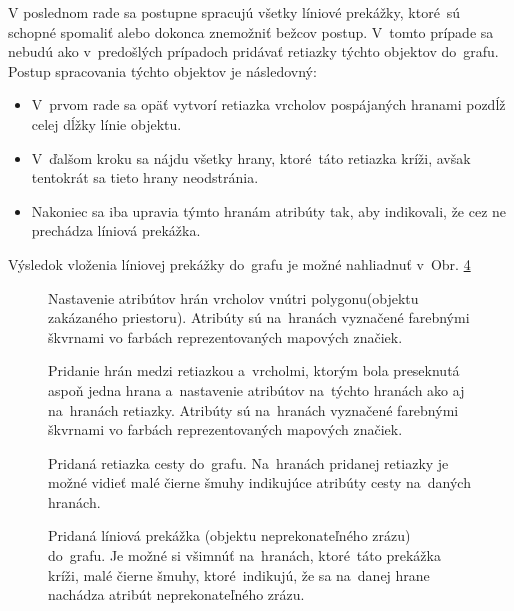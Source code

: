 V poslednom rade sa postupne spracujú všetky líniové prekážky, ktoré~sú schopné spomaliť alebo dokonca znemožniť bežcov postup. V~tomto prípade sa nebudú ako v~predošlých prípadoch pridávať retiazky týchto objektov do~grafu. Postup spracovania týchto objektov je následovný:
\begin{itemize}
    \item V~prvom rade sa opäť vytvorí retiazka vrcholov pospájaných hranami pozdĺž celej dĺžky línie objektu.
    \item V~ďalšom kroku sa nájdu všetky hrany, ktoré~táto retiazka kríži, avšak tentokrát sa tieto hrany neodstránia.
    \item Nakoniec sa iba upravia týmto hranám atribúty tak, aby indikovali, že cez ne prechádza líniová prekážka.
\end{itemize}

Výsledok vloženia líniovej prekážky do~grafu je možné nahliadnuť v~Obr. \ref{obr25:added_linear_obstacle}

\begin{figure}[p]\centering
{}
\caption{Nastavenie atribútov hrán vrcholov vnútri polygonu(objektu zakázaného priestoru). Atribúty sú na~hranách vyznačené farebnými škvrnami vo farbách reprezentovaných mapových značiek.} 
\label{obr22:inner_edges_attributes_set}
\end{figure}

\begin{figure}[p]\centering
{}
\caption{Pridanie hrán medzi retiazkou a~vrcholmi, ktorým bola preseknutá aspoň jedna hrana a~nastavenie atribútov na~týchto hranách ako aj na~hranách retiazky. Atribúty sú na~hranách vyznačené farebnými škvrnami vo farbách reprezentovaných mapových značiek.} 
\label{obr23:connect_polygon_chain_to_vertices_of_cut_edges}
\end{figure}

\begin{figure}[p]\centering
{}
\caption{Pridaná retiazka cesty do~grafu. Na~hranách pridanej retiazky je možné vidieť malé čierne šmuhy indikujúce atribúty cesty na~daných hranách.} 
\label{obr24:connect_path_chain_to_vertices_of_cut_edges}
\end{figure}

\begin{figure}[p]\centering
{}
\caption{Pridaná líniová prekážka (objektu neprekonateľného zrázu) do~grafu. Je možné si všimnúť na~hranách, ktoré~táto prekážka kríži, malé čierne šmuhy, ktoré~indikujú, že sa na~danej hrane nachádza atribút neprekonateľného zrázu.} 
\label{obr25:added_linear_obstacle}
\end{figure}

